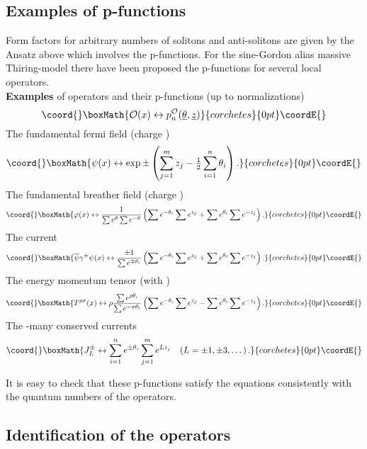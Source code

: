 \documentclass[a4paper,12pt]{article}
\begin{document}
\subsection*{Examples of p-functions}

Form factors for arbitrary numbers of solitons and anti-solitons are given
by the Ansatz above which involves the p-functions. For the sine-Gordon
alias massive Thiring-model there have been proposed the p-functions for
several local operators. \\[3pt]
\textbf{Examples} of operators and their p-functions (up to normalizations)
\cite{BK} 
\[\coord{}\boxMath{
\mathcal{O}(x)\leftrightarrow p_{n}^{\mathcal{O}}(\underline{\theta },%
\underline{z}) 
}{corchetes}{0pt}\coordE{}\]
{The fundamental fermi field} (charge \coordHE{}) \cite{BFKZ} 
\[\coord{}\boxMath{
\psi (x)\leftrightarrow \exp \pm \left( \sum_{j=1}^{m}z_{j}-\tfrac{1}{2}%
\sum_{i=1}^{n}\theta _{i}\right) . 
}{corchetes}{0pt}\coordE{}\]
{The fundamental breather field} (charge \coordHE{}) \cite{BK} 
\[\coord{}\boxMath{
\varphi (x)\leftrightarrow \frac{1}{\sum e^{\theta }\sum e^{-\theta }}\left(
\sum e^{-\theta _{i}}\sum e^{z_{j}}+\sum e^{\theta _{i}}\sum
e^{-z_{j}}\right) . 
}{corchetes}{0pt}\coordE{}\]
{The current} \coordHE{} \cite{BK} 
\[\coord{}\boxMath{
\overline{\psi }\gamma ^{\pm }\psi (x)\leftrightarrow \frac{\pm 1}{\sum
e^{\mp \theta _{i}}}\left( \sum e^{-\theta _{i}}\sum e^{z_{j}}+\sum
e^{\theta _{i}}\sum e^{-z_{j}}\right) . 
}{corchetes}{0pt}\coordE{}\]
{The energy momentum tensor} (with \myHighlight{$\rho ,\sigma =+,-$}\coordHE{}) \cite{BK} 
\[\coord{}\boxMath{
T{^{\rho \sigma }(x)}\leftrightarrow \rho \frac{\sum e^{\rho \theta _{i}}}{%
\sum e^{-\sigma \theta _{i}}}\left( \sum e^{-\theta _{i}}\sum e^{z_{j}}-\sum
e^{\theta _{i}}\sum e^{-z_{j}}\right) . 
}{corchetes}{0pt}\coordE{}\]
The \myHighlight{$\infty $}\coordHE{}-many conserved currents \cite{BK} 
\[\coord{}\boxMath{
J_{L}^{\pm }\leftrightarrow \sum_{i=1}^{n}e^{\pm \theta
_{i}}\sum_{j=1}^{m}e^{Lz_{j}}\quad (L=\pm 1,\pm 3,\dots )\,. 
}{corchetes}{0pt}\coordE{}\]

It is easy to check that these p-functions satisfy the equations \coordHE{} consistently with the quantum numbers of the operators.

\subsection*{Identification of the operators}
\end{document}
